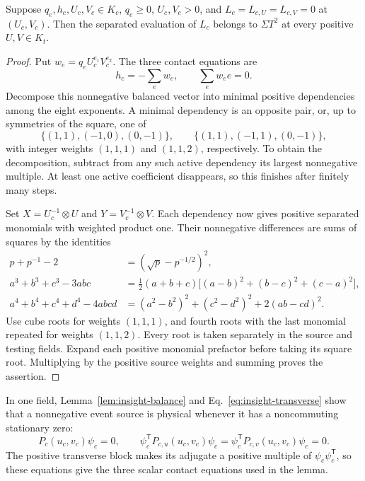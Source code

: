 \begin{lemma}\label{lem:insight-balance}
Suppose $q_e,h_c,U_c,V_c\in K_c$, $q_e\ge0$, $U_c,V_c>0$, and
$L_c=L_{c,U}=L_{c,V}=0$ at $(U_c,V_c)$. Then the separated
evaluation of $L_c$ belongs to $\Sigma T^2$ at every positive
$U,V\in K_t$.
\end{lemma}
\begin{proof}
Put $w_e=q_eU_c^{e_1}V_c^{e_2}$. The three contact equations are
\[
 h_c=-\sum_e w_e,\qquad \sum_e w_e e=0.
\]
Decompose this nonnegative balanced vector into minimal positive
dependencies among the eight exponents. A minimal dependency is
an opposite pair, or, up to symmetries of the square, one of
\[
 \{(1,1),(-1,0),(0,-1)\},\qquad
 \{(1,1),(-1,1),(0,-1)\},
\]
with integer weights $(1,1,1)$ and $(1,1,2)$, respectively.
To obtain the decomposition, subtract from any such active
dependency its largest nonnegative multiple. At least one active
coefficient disappears, so this finishes after finitely many steps.

Set $X=U_c^{-1}\otimes U$ and $Y=V_c^{-1}\otimes V$.
Each dependency now gives positive separated monomials with
weighted product one. Their nonnegative differences are sums of
squares by the identities
\begin{align*}
 p+p^{-1}-2&=(\sqrt p-p^{-1/2})^2,\\
 a^3+b^3+c^3-3abc
 &=\tfrac12(a+b+c)\bigl[(a-b)^2+(b-c)^2+(c-a)^2\bigr],\\
 a^4+b^4+c^4+d^4-4abcd
 &=(a^2-b^2)^2+(c^2-d^2)^2+2(ab-cd)^2.
\end{align*}
Use cube roots for weights $(1,1,1)$, and fourth roots with the
last monomial repeated for weights $(1,1,2)$. Every root is taken
separately in the source and testing fields. Expand each positive
monomial prefactor before taking its square root. Multiplying by
the positive source weights and summing proves the assertion.
\end{proof}

In one field, Lemma~\ref{lem:insight-balance} and
Eq.~\eqref{eq:insight-transverse} show that a nonnegative event
source is physical whenever it has a noncommuting stationary zero:
\begin{equation}\label{eq:insight-contact}
 P_c(u_c,v_c)\psi_c=0,\qquad
 \psi_c^{\mathsf T}P_{c,u}(u_c,v_c)\psi_c=
 \psi_c^{\mathsf T}P_{c,v}(u_c,v_c)\psi_c=0.
\end{equation}
The positive transverse block makes its adjugate a positive
multiple of $\psi_c\psi_c^{\mathsf T}$, so these equations give
the three scalar contact equations used in the lemma.

